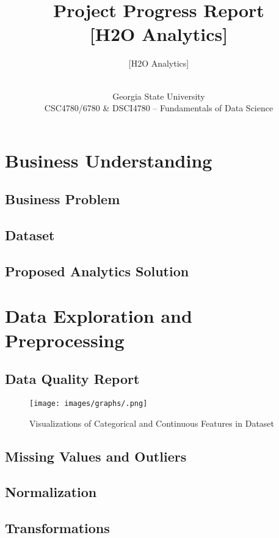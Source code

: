 \documentclass[12pt]{article}
\title{\vspace{-1.5cm}Project Progress Report \\ \large [H2O Analytics]}
\author{
[H2O Analytics]\\
[Julian Ornelase]\\
[Emery Hagye]
}
\date{Georgia State University\\ CSC4780/6780 \& DSCI4780 – Fundamentals of Data Science \\ [Spring 2024]}
\begin{document}
\maketitle
\newpage

\tableofcontents
\newpage

\section{Business Understanding}
\subsection{Business Problem}
\lipsum[1-2]

\subsection{Dataset}
\lipsum[3]

\subsection{Proposed Analytics Solution}
\lipsum[4-5]

\section{Data Exploration and Preprocessing}
\subsection{Data Quality Report}
\lipsum[6]

\begin{figure}[H]
\centering
\texttt{[image: images/graphs/.png]}
\caption{Visualizations of Categorical and Continuous Features in Dataset}
\end{figure}

\subsection{Missing Values and Outliers}
\lipsum[7]

\subsection{Normalization}
\lipsum[8]

\subsection{Transformations}
\lipsum[9]
\end{document}
